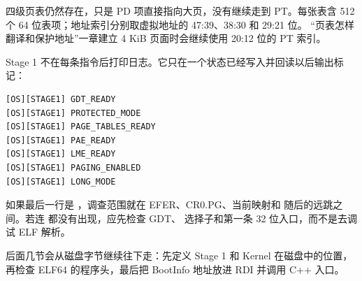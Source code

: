 四级页表仍然存在，只是 PD 项直接指向大页，没有继续走到 PT。每张表含
512 个 64 位表项；地址索引分别取虚拟地址的 47:39、38:30 和 29:21 位。
“页表怎样翻译和保护地址”一章建立 4 KiB 页面时会继续使用 20:12 位的 PT 索引。

Stage 1 不在每条指令后打印日志。它只在一个状态已经写入并回读以后输出标记：

\begin{lstlisting}
[OS][STAGE1] GDT_READY
[OS][STAGE1] PROTECTED_MODE
[OS][STAGE1] PAGE_TABLES_READY
[OS][STAGE1] PAE_READY
[OS][STAGE1] LME_READY
[OS][STAGE1] PAGING_ENABLED
[OS][STAGE1] LONG_MODE
\end{lstlisting}

如果最后一行是 ，调查范围就在 EFER、CR0.PG、当前映射和
随后的远跳之间。若连  都没有出现，应先检查 GDT、
选择子和第一条 32 位入口，而不是去调试 ELF 解析。

后面几节会从磁盘字节继续往下走：先定义 Stage 1 和 Kernel 在磁盘中的位置，
再检查 ELF64 的程序头，最后把 BootInfo 地址放进 RDI 并调用 C++ 入口。
